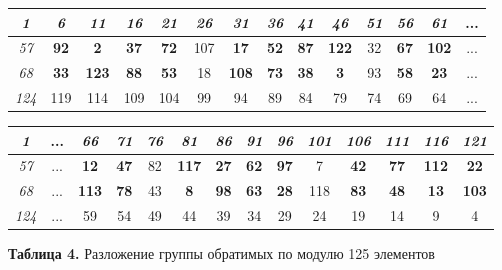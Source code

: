 \documentclass{../template/mai_book}
\begin{document}
\begin{center}
    \begin{tabular}{| c | c | c | c | c | c | c | c | c | c | c | c | c | c }
    \hline
    \itshape{1} & \itshape{6} & \itshape{11} & \itshape{16} & \itshape{21} & \itshape{26} & \itshape{31} & \itshape{36} & \itshape{41} & \itshape{46} & \itshape{51} & \itshape{56} & \itshape{61} & ... \\ \hline
    \itshape{57} & \textbf{92} & \textbf{2} & \textbf{37} & \textbf{72} & 107 & \textbf{17} & \textbf{52} & \textbf{87} & \textbf{122} & 32 & \textbf{67} & \textbf{102} & ...
\\ \hline
    \itshape{68} & \textbf{33} & \textbf{123} & \textbf{88} & \textbf{53} & 18 & \textbf{108} & \textbf{73} & \textbf{38} & \textbf{3} & 93 & \textbf{58} & \textbf{23} & ...
\\ \hline
    \itshape{124} & 119 & 114 & 109 & 104 & 99 & 94 & 89 & 84 & 79 & 74 & 69 & 64 & ...
\\ \hline
    \end{tabular}
\end{center}

\begin{center}
    \begin{tabular}{| c | c  c | c | c | c | c | c | c | c | c | c | c | c }
    \hline
    \itshape{1} & ... & \itshape{66} & \itshape{71} & \itshape{76} & \itshape{81} & \itshape{86} & \itshape{91} & \itshape{96} & \itshape{101} & \itshape{106} & \itshape{111} & \itshape{116} & \itshape{121} \\ \hline
    \itshape{57} & ... & \textbf{12} & \textbf{47} & 82 & \textbf{117} & \textbf{27} & \textbf{62} & \textbf{97} & 7 & \textbf{42} & \textbf{77} & \textbf{112} & \textbf{22}
\\ \hline
    \itshape{68} & ... & \textbf{113} & \textbf{78} & 43 & \textbf{8} & \textbf{98} & \textbf{63} & \textbf{28} & 118 & \textbf{83} & \textbf{48} & \textbf{13} & \textbf{103}
\\ \hline
    \itshape{124} & ... & 59 & 54 & 49 & 44 & 39 & 34 & 29 & 24 & 19 & 14 & 9 & 4
\\ \hline
    \end{tabular}
\end{center}

\noindent \textbf{Таблица 4.} Разложение группы обратимых по модулю 125 элементов \par

\vspace{\baselineskip}
\end{document}
